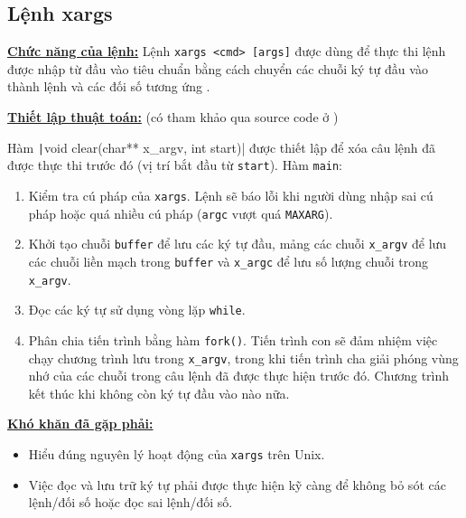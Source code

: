 \subsection{Lệnh xargs}
\underline{\textbf{Chức năng của lệnh:}} Lệnh \verb|xargs <cmd> [args]| được dùng để thực thi lệnh được nhập từ đầu vào tiêu chuẩn bằng cách chuyển các chuỗi ký tự đầu vào thành lệnh và các đối số tương ứng \cite{mit-xv6} \cite{xargs}.

\underline{\textbf{Thiết lập thuật toán:}} (có tham khảo qua source code ở \cite{xargscode})

Hàm \texttt|void clear(char** x_argv, int start)| được thiết lập để xóa câu lệnh đã được thực thi trước đó (vị trí bắt đầu từ \verb|start|).
Hàm \verb|main|:
\begin{enumerate}[labelindent=1em, labelsep=0.2cm, leftmargin=1cm, wide=\parindent, topsep=0.1cm, itemsep=-1ex, partopsep=1.5ex, parsep=1.5ex]
	\item Kiểm tra cú pháp của \verb|xargs|. Lệnh sẽ báo lỗi khi người dùng nhập sai cú pháp hoặc quá nhiều cú pháp (\verb|argc| vượt quá \verb|MAXARG|).
	\item Khởi tạo chuỗi \verb|buffer| để lưu các ký tự đầu, mảng các chuỗi \verb|x_argv| để lưu các chuỗi liền mạch trong \verb|buffer| và \verb|x_argc| để lưu số lượng chuỗi trong \verb|x_argv|.
	\item Đọc các ký tự sử dụng vòng lặp \verb|while|.
	\item Phân chia tiến trình bằng hàm \verb|fork()|. Tiến trình con sẽ đảm nhiệm việc chạy chương trình lưu trong \verb|x_argv|, trong khi tiến trình cha giải phóng vùng nhớ của các chuỗi trong câu lệnh đã được thực hiện trước đó. Chương trình kết thúc khi không còn ký tự đầu vào nào nữa.
\end{enumerate}

\underline{\textbf{Khó khăn đã gặp phải:}}
\begin{itemize}[labelindent=1em, labelsep=0.2cm, leftmargin=1cm, wide=\parindent, topsep=0.1cm, itemsep=-1ex, partopsep=1.5ex, parsep=1.5ex]
	\item Hiểu đúng nguyên lý hoạt động của \verb|xargs| trên Unix.
	\item Việc đọc và lưu trữ ký tự phải được thực hiện kỹ càng để không bỏ sót các lệnh/đối số hoặc đọc sai lệnh/đối số.
\end{itemize}

